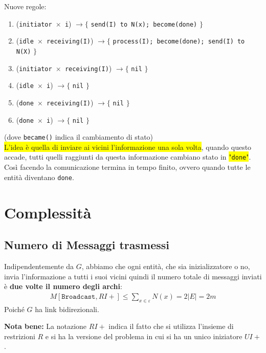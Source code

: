 Nuove regole:
\begin{enumerate}
    \item (\texttt{initiator $\times$ i}) $\rightarrow \lbrace$ \texttt{send(I) to N(x);
              become(done)} $\rbrace$
    \item (\texttt{idle $\times$ receiving(I)}) $\rightarrow \lbrace$ \texttt{process(I);
              become(done); send(I) to N(X)} $\rbrace$
    \item (\texttt{initiator $\times$ receiving(I)}) $\rightarrow \lbrace$ \texttt{nil}
          $\rbrace$
    \item (\texttt{idle $\times$ i}) $\rightarrow \lbrace$ \texttt{nil} $\rbrace$
    \item (\texttt{done $\times$ receiving(I)}) $\rightarrow \lbrace$ \texttt{nil}
          $\rbrace$
    \item (\texttt{done $\times$ i}) $\rightarrow \lbrace$ \texttt{nil} $\rbrace$
\end{enumerate}

(dove \verb|became()| indica il cambiamento di stato)\\

\colorbox{yellow}{L'idea è quella di inviare ai vicini l'informazione una sola
    volta}, quando questo accade, tutti quelli raggiunti da questa informazione
cambiano stato in \colorbox{yellow}{"\texttt{done}"}. Così facendo la comunicazione
termina in tempo finito, ovvero quando tutte le entità diventano \texttt{done}.

\section{Complessità}
\subsection{Numero di Messaggi trasmessi}
Indipendentemente da $G$, abbiamo che ogni entità, che sia inizializzatore o no,
invia l'informazione a tutti i suoi vicini quindi il numero totale di messaggi
inviati è \textbf{due volte il numero degli archi}:
\begin{eqnarray}
    M[\texttt{Broadcast}, RI+]  \leq \sum_{x \in \varepsilon} N(x) = 2|E| = 2m
    \nonumber
\end{eqnarray}
Poiché $G$ ha link bidirezionali.

\textbf{Nota bene:} La notazione $RI+$ indica il fatto che si utilizza l'insieme
di restrizioni $R$ e si ha la versione del problema in cui si ha un unico
iniziatore $UI+$.


